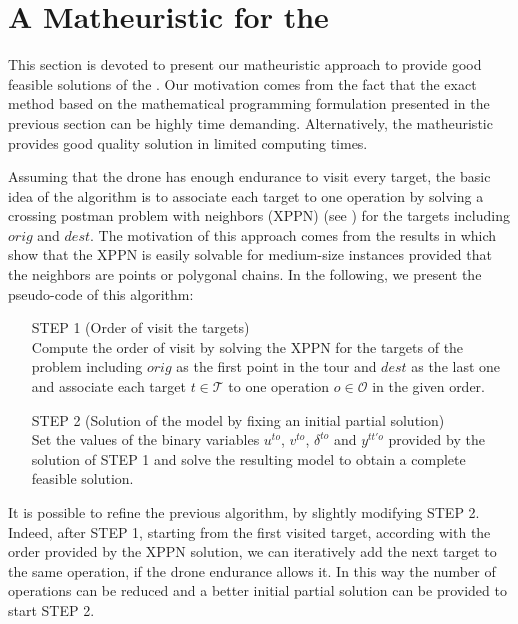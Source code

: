 \section{A Matheuristic for the \AMD}\label{Math}
\noindent
This section is devoted to present our matheuristic approach to provide good feasible solutions of the \AMD. Our motivation comes from the fact that the exact method based on the mathematical programming formulation presented in the previous section can be highly time demanding. Alternatively, the matheuristic provides good quality solution in limited computing times.\\
\noindent

Assuming that the drone has enough endurance to visit every target, the basic idea of the algorithm is to associate each target to one operation by solving a crossing postman problem with neighbors  (XPPN) (see \cite{Puerto2021}) for the targets including $orig$ and $dest$. The motivation of this approach comes from the results in \cite{Puerto2021} which show that the XPPN is easily solvable for medium-size instances provided that the neighbors are points or polygonal chains. 
In the following, we present the pseudo-code of this algorithm:



\begin{itemize} 
\item[STEP 1] (Order of visit the targets)\\
Compute the order of visit by solving the XPPN for the targets of the problem including $orig$ as the first point in the tour and $dest$ as the last one and associate each target $t\in\mathcal T$ to one operation $o\in\mathcal O$ in the given order.
\item [STEP 2] (Solution of the \AMD\space model by fixing an initial partial solution)\\
Set the values of the binary variables $u^{to}$, $v^{to}$, $\delta^{to}$ and $y^{tt'o}$ provided by the solution of STEP 1 and solve the resulting \AMD\space model to obtain a complete feasible solution.
\end{itemize}


It is possible to refine the previous algorithm, by slightly modifying STEP 2. Indeed, after STEP 1, starting from the first visited target, according with the order provided by the XPPN solution, we can iteratively add the next target to the same operation, if the drone endurance allows it. In this way the number of operations can be reduced and a better initial partial solution can be provided to start STEP 2.



